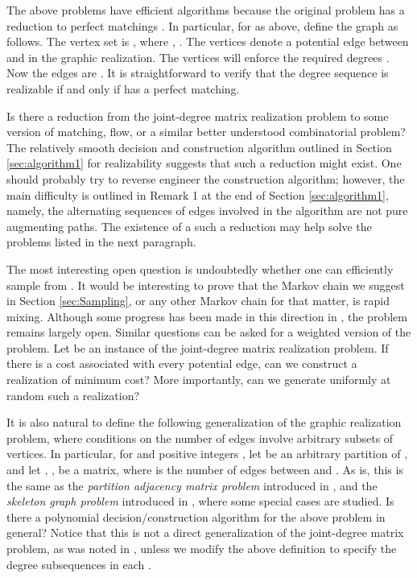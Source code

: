 \documentclass[12pt,a4paper]{article}
\theoremstyle{definition}
\theoremstyle{plain}
\begin{document}
The above problems have efficient algorithms
because the original problem has a reduction
to perfect matchings \cite{Val79,JS2,Sinclair}.
In particular, for
 as above,
define the graph 
as follows.
The vertex set is ,
where ,
              .
The vertices  denote a potential
edge between  and  in the graphic realization.
The vertices  will enforce the required degrees .
Now the edges are
.
It is straightforward to verify that
the degree sequence is realizable
if and only if  
has a perfect matching.

Is there a reduction from the
joint-degree matrix realization problem to some
version of matching, flow, or a similar
better understood combinatorial problem?
The relatively smooth decision and construction
algorithm outlined in Section \ref{sec:algorithm1} for realizability
suggests that such a reduction might exist.
One should probably try to reverse engineer the construction algorithm;
however, the main difficulty is outlined in Remark 1 at the end of 
Section \ref{sec:algorithm1},
namely, the alternating sequences of edges involved in the
algorithm are not pure augmenting paths. The existence of a
such a reduction may help solve the problems listed in the next paragraph.

The most interesting open question is undoubtedly whether one can efficiently sample from . It would be interesting to 
prove that the Markov chain we suggest in Section \ref{sec:Sampling}, or any other
Markov chain for that matter, is rapid mixing. Although some progress has been made in this direction in \cite{EMT15}, the problem remains largely open. Similar questions can be asked for a weighted version of the problem.
Let  be an instance of the joint-degree matrix
realization problem.
If there is a cost associated with every potential edge,
can we construct a realization of minimum cost?
More importantly, can we generate uniformly at random such a realization? 


It is also natural to define the following generalization of the graphic realization problem, where conditions on the number of edges
involve arbitrary subsets of vertices.
In particular, for 
and positive integers ,
let 
be an arbitrary partition of ,
and let , ,
be a  matrix, where  is the number of edges between  and . As is, this is the same as the \emph{partition adjacency matrix problem} introduced in \cite{Ch14}, and the \emph{skeleton graph problem} introduced in \cite{EHIM15}, where some special cases are studied.
Is there a polynomial decision/construction algorithm for the above problem in general?
Notice that this is not a direct generalization of the joint-degree matrix problem, as was noted in \cite{EHIM15}, unless we modify the above definition to specify the degree subsequences in each .
\end{document}
